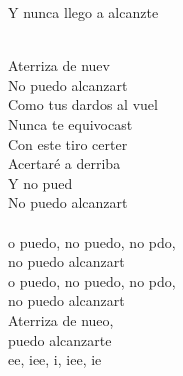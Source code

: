 \begin{cancion}
	Y nunca llego a alcanzte\\\jump\\
	\begin{chorus}%
	Aterriza de nuev  \\
	No puedo alcanzart\\
	Como tus dardos al vuel  \\
	Nunca te equivocast\\
	Con este tiro certer  \\
	Acertaré a derriba\\
	Y no pued  \\
	No puedo alcanzart\\
\jump\\
	o puedo, no puedo, no pdo, \\
	no puedo alcanzart\\
	o puedo, no puedo, no pdo,  \\
	no puedo alcanzart\\
	Aterriza de nueo, \\
	 puedo alcanzarte\\
	ee, iee, i, iee, ie\\
	\end{chorus}%
	\jump\\
\end{cancion}%
